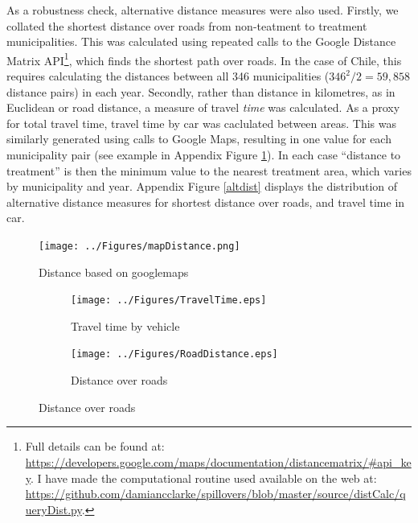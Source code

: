\documentclass[11pt,subeqn]{article}
\begin{document}
\begin{spacing}{1.4}
As a robustness check, alternative distance measures were also used.
Firstly, we collated the shortest distance over roads from non-teatment to 
treatment municipalities.  This was calculated using repeated calls to the 
Google Distance Matrix API\footnote{Full details can be found at:
\url{https://developers.google.com/maps/documentation/distancematrix/\#api\_key}.
I have made the computational routine used available on the web at:
\url{https://github.com/damiancclarke/spillovers/blob/master/source/distCalc/queryDist.py}.}, 
which finds the shortest path over roads.  In the case of Chile, this requires 
calculating the distances between all 346 municipalities ($346^2/2=59,858$ 
distance pairs) in each year.  Secondly, rather than distance in 
kilometres, as in Euclidean or road distance, a measure of travel \emph{time} 
was calculated.  As a proxy for total travel time, travel time by car was 
caclulated between areas.  This was similarly generated using calls to Google 
Maps, resulting in one value for each municipality pair (see example in Appendix
Figure \ref{googdist}).  In each case ``distance to treatment'' is then the 
minimum value to the nearest treatment area, which varies by municipality and 
year.  Appendix Figure \ref{altdist} displays the distribution of alternative
distance measures for shortest distance over roads, and travel time in car.

\begin{figure}[htpb!]
\texttt{[image: ../Figures/mapDistance.png]}
\caption{Distance based on googlemaps}
\label{googdist}
\end{figure}

\begin{figure}[htpb!]
\begin{center}
\caption{Alternative Measures of Distance to Treatment}
\label{altdist}
\begin{subfigure}{.5\textwidth}
  \centering
  \texttt{[image: ../Figures/TravelTime.eps]}
  \caption{Travel time by vehicle}
  \label{travelTime}
\end{subfigure}%
\begin{subfigure}{.5\textwidth}
  \centering
  \texttt{[image: ../Figures/RoadDistance.eps]}
  \caption{Distance over roads}
  \label{roadDist}
\end{subfigure}
\end{center}
\vspace{-4mm}
\end{figure}




\end{spacing}
\end{document}
